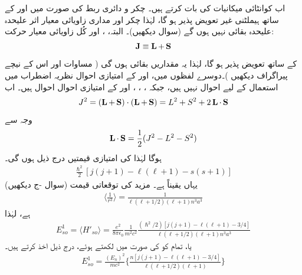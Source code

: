  اب کوانٹائی میکانیات کی بات کرتے ہیں۔ چکر و دائری ربط کی صورت میں  اور  کے ساتھ ہیملٹنی غیر تعویض پذیر  ہو گا، لہٰذا چکر اور مداری زاویائی معیار اثر علیحدہ علیحدہ بقائی نہیں ہوں گے (سوال  دیکھیں)۔ البتہ، ،  اور کُل زاویائی معیار حرکت:
\begin{align}\label{مساوات_غیر_مضطرب_ایل_جمع_ایس_برابر_جے}
\operatorname{\mathbf{J}} \equiv \operatorname{\mathbf{L}} + \operatorname{\mathbf{S}}
\end{align}
کے ساتھ  تعویض پذیر  ہو گا، لہٰذا یہ مقداریں بقائی ہوں گی ( مساوات  اور اس کے نیچے پیراگراف دیکھیں )۔دوسرے لفظوں میں،  اور  کے امتیازی احوال نظریہ اضطراب میں استعمال کے لیے  احوال نہیں ہیں، جبکہ ، ، ، اور  کے امتیازی احوال  احوال ہیں۔ اب 
\begin{align*}
J^2 = (\operatorname{\mathbf{L}} + \operatorname{\mathbf{S}}) \cdot (\operatorname{\mathbf{L}} + \operatorname{\mathbf{S}}) = L^2 + S^2 + 2 \operatorname{\mathbf{L}} \cdot \operatorname{\mathbf{S}}
\end{align*}
وجہ سے 
\begin{align}
\operatorname{\mathbf{L}} \cdot \operatorname{\mathbf{S}} = \frac{1}{2} (J^2 - L^2 - S^2)
\end{align}
ہوگا لہٰذا  کی امتیازی  قیمتیں  درج ذیل ہوں گی۔
\begin{align*}
\frac{\hslash^2}{2} [j (j + 1) - \ell (\ell + 1) - s(s + 1)]
\end{align*}
یہاں یقیناً  ہے۔ مزید  کی توقعاتی قیمت (سوال -ج دیکھیں) 
\begin{align}\label{مساوات_غیر_مضطرب_آر_تین}
\big\langle \frac{1}{r^3} \big\rangle = \frac{1}{\ell (\ell + 1/2) (\ell + 1) n^3 a^3} 
\end{align}
 ہے، لہٰذا 
\begin{align*}
E_{so}^1 = \langle H'_{so} \rangle = \frac{e^2}{8 \pi \epsilon_0} \frac{1}{m^2 c^2} \frac{(\hslash^2 /2) [j(j + 1) - \ell (\ell + 1) - 3/4]}{\ell (\ell + 1/2)(\ell + 1)n^3 a^3}
\end{align*} 
 یا، تمام کو  کی صورت میں لکھتے ہوئے، درج ذیل اخذ کرتے ہیں۔ 
\begin{align}\label{مساوات_غیر_مضطرب_چکر_و_مدار_ربط}
E^1_{so} = \frac{(E_n)^2}{mc^2} \Big \{ \frac{n[j(j + 1) - \ell (\ell + 1) - 3/4]}{\ell (\ell + 1/2)(\ell + 1)} \Big \}
\end{align}

